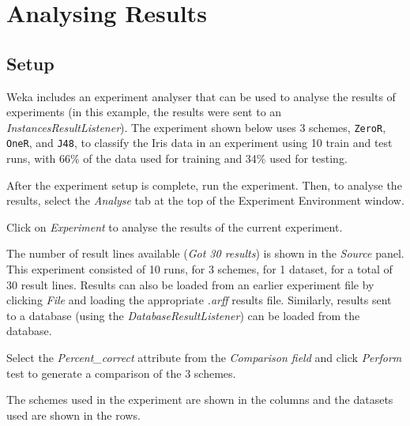\documentclass[a4paper]{article}
\begin{document}

\newpage
\section{Analysing Results}

\subsection{Setup}

Weka includes an experiment analyser that can be used to analyse the results of experiments (in this example, the results were sent to an \textit{InstancesResultListener}). The experiment shown below uses 3 schemes, \texttt{ZeroR}, \texttt{OneR}, and \texttt{J48}, to classify the Iris data in an experiment using 10 train and test runs, with 66\% of the data used for training and 34\% used for testing.
\begin{center}
\end{center}

After the experiment setup is complete, run the experiment. Then, to analyse the results, select the \textit{Analyse} tab at the top of the Experiment Environment window.

Click on \textit{Experiment} to analyse the results of the current experiment.
\begin{center}
\end{center}

The number of result lines available (\textit{Got 30 results}) is shown in the \textit{Source} panel. This experiment consisted of 10 runs, for 3 schemes, for 1 dataset, for a total of 30 result lines. Results can also be loaded from an earlier experiment file by clicking \textit{File} and loading the appropriate \textit{.arff} results file. Similarly, results sent to a database (using the \textit{DatabaseResultListener}) can be loaded from the database.

Select the \textit{Percent\_correct} attribute from the \textit{Comparison field} and click \textit{Perform} test to generate a comparison of the 3 schemes.
\begin{center}
\end{center}

The schemes used in the experiment are shown in the columns and the datasets used are shown in the rows.
\end{document}
